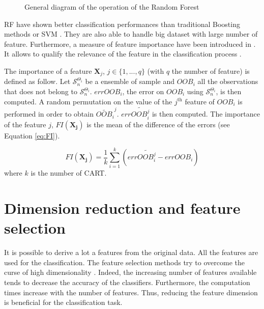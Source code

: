 \begin{figure}[htbp]
\begin{center}
\end{center}
\caption{General diagram of the operation of the Random Forest}
\label{fig:RF_method}
\end{figure}


RF have shown better classification performances than traditional Boosting methods \citep{breiman2001random} or SVM \citep{pal2005random}. They are also able to handle big dataset with large number of feature. Furthermore, a measure of feature importance have been introduced in \cite{breiman2001random}. It allows to qualify the relevance of the feature in the classification process \citep{strobl2007bias}.

The importance of a feature $\mathbf{X}_{j}$, $j\in\{1,...,q\}$ (with $q$ the number of feature) is defined as follow. Let $\mathcal{S}_{n}^{\Theta_{i}}$ be a ensemble of sample and $OOB_{i}$ all the observations that does not belong to $\mathcal{S}_{n}^{\Theta_{i}}$. $errOOB_{i}$, the error on $OOB_{i}$ using $\mathcal{S}_{n}^{\Theta_{i}}$, is then computed. A random permutation on the value of the $j^{\text{th}}$ feature of $OOB_{i}$ is performed in order to obtain $\widetilde{OOB_{i}}^j$. $err\widetilde{OOB_{i}^{j}}$ is then computed. The importance of the feature $j$, $FI(\mathbf{X_{j}})$ is the mean of the difference of the errors (see Equation \ref{eq:FI}).

\begin{equation}
\label{eq:FI}
FI(\mathbf{X_{j}})=\frac{1}{k}\sum_{i=1}^{k}(err\widetilde{OOB_{i}^{j}}-errOOB_{i})
\end{equation}
where $k$ is the number of CART.


\section{Dimension reduction and feature selection}
It is possible to derive a lot a features from the original data. All the features are used for the classification. The feature selection methods try to overcome the curse of high dimensionality \citep{bellman2015adaptive, hughes1968mean}. Indeed, the increasing number of features available tends to decrease the accuracy of the classifiers. Furthermore, the computation times increase with the number of features. Thus, reducing the feature dimension is beneficial for the classification task.

